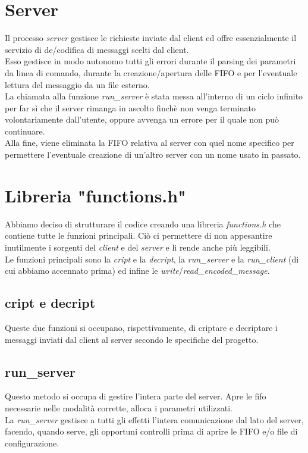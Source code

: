 \documentclass[a4paper,9pt]{article}
\begin{document}
\section{Server}
Il processo \emph{server} gestisce le richieste inviate dal client ed offre essenzialmente il servizio di de/codifica di messaggi scelti dal client.\\
Esso gestisce in modo autonomo tutti gli errori durante il parsing dei parametri da linea di comando, durante la creazione/apertura delle FIFO e per l'eventuale lettura del messaggio da un file esterno.\\
La chiamata alla funzione \emph{run\_server} è stata messa all'interno di un ciclo infinito per far sì che il server rimanga in ascolto finchè non venga terminato volontariamente dall'utente, oppure avvenga un errore per il quale non può continuare.\\
Alla fine, viene eliminata la FIFO relativa al server con quel nome specifico per permettere l'eventuale creazione di un'altro server con un nome usato in passato.

\section{Libreria "functions.h"}
Abbiamo deciso di strutturare il codice creando una libreria \emph{functions.h} che contiene tutte le funzioni principali. Ciò ci permettere di non appesantire inutilmente i sorgenti del \emph{client} e del \emph{server} e li rende anche più leggibili.\\
Le funzioni principali sono la \emph{cript} e la \emph{decript}, la \emph{run\_server} e la \emph{run\_client} (di cui abbiamo accennato prima) ed infine le \emph{write}/\emph{read\_encoded\_message}.
\subsection{cript e decript}
Queste due funzioni si occupano, rispettivamente, di criptare e decriptare i messaggi inviati dal client al server secondo le specifiche del progetto.
\subsection{run\_server}
Questo metodo si occupa di gestire l'intera parte del server. Apre le fifo necessarie nelle modalità corrette, alloca i parametri utilizzati.\\ 
La \emph{run\_server} gestisce a tutti gli effetti l'intera comunicazione dal lato del server, facendo, quando serve, gli opportuni controlli prima di aprire le FIFO e/o file di configurazione.
\end{document}
